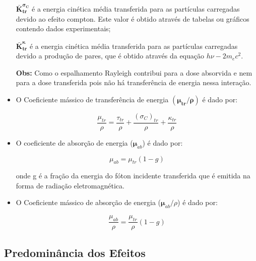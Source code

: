 \documentclass[11pt,a4paper]{article}
\begin{document}
\begin{itemize}
                \noindent $\mathbf{\bar{K}_{tr}^{\sigma_C}}$ é a energia cinética média transferida para as partículas carregadas devido ao efeito compton. Este valor é obtido através de tabelas ou gráficos contendo dados experimentais; 


                \noindent $\mathbf{\bar{K}_{tr}^{\kappa}}$ é a energia cinética média transferida para as partículas carregadas devido a produção de pares, que é obtido através da equação $h\nu - 2m_ec^2$.


                \textbf{Obs:} Como o espalhamento Rayleigh  contribui para a dose absorvida e nem para a dose transferida pois não há transferência de energia nessa interação.

            \item O Coeficiente mássico de transferência de energia $(\mathbf{\mu_{tr}/\rho})$ é dado por:
            
                \begin{equation}
                    \frac{\mu_{tr}}{\rho} = \frac{\tau_{tr}}{\rho} + \frac{(\sigma_C)_{tr}}{\rho} + \frac{\kappa_{tr}}{\rho}
                \end{equation}

            
            \item O coeficiente de absorção de energia ($\mathbf{\mu}_{ab}$) é dado por:
            
                \begin{equation}
                    \mu_{ab} = \mu_{tr}(1 - g)
                \end{equation}

            \noindent onde g é a fração da energia do fóton incidente transferida que é emitida na forma de radiação eletromagnética. 

            \item O Coeficiente mássico de absorção de energia ($\mathbf{\mu}_{ab}/\rho$) é dado por:
            
                \begin{equation}
                    \frac{\mu_{ab}}{\rho} = \frac{\mu_{tr}}{\rho}(1 - g)
                \end{equation}

            \end{itemize}

        \subsection{Predominância dos Efeitos}
\end{document}
